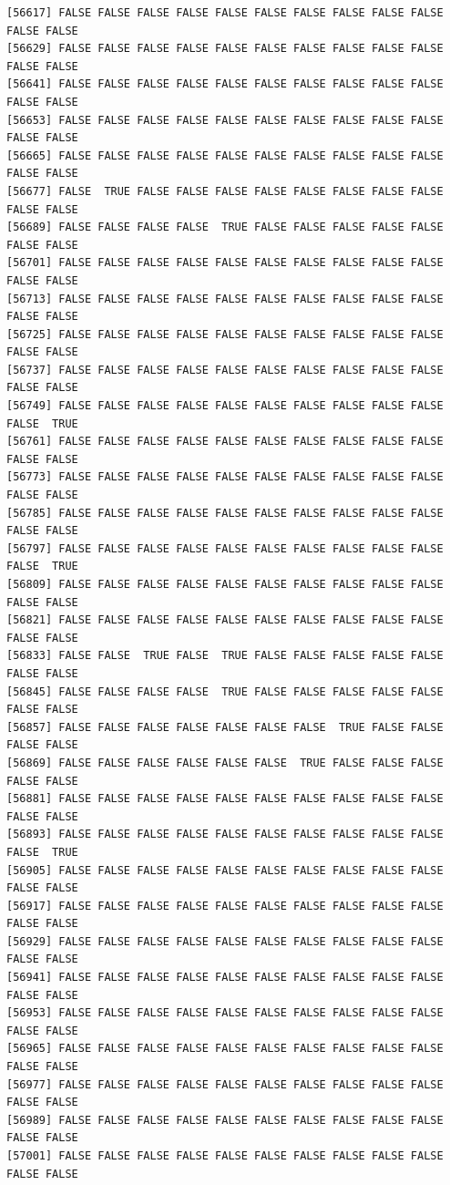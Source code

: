 \documentclass[
  a4paper,
  DIV=11,
  numbers=noendperiod]{scrartcl}
\begin{document}
\begin{verbatim}
[56617] FALSE FALSE FALSE FALSE FALSE FALSE FALSE FALSE FALSE FALSE FALSE FALSE
[56629] FALSE FALSE FALSE FALSE FALSE FALSE FALSE FALSE FALSE FALSE FALSE FALSE
[56641] FALSE FALSE FALSE FALSE FALSE FALSE FALSE FALSE FALSE FALSE FALSE FALSE
[56653] FALSE FALSE FALSE FALSE FALSE FALSE FALSE FALSE FALSE FALSE FALSE FALSE
[56665] FALSE FALSE FALSE FALSE FALSE FALSE FALSE FALSE FALSE FALSE FALSE FALSE
[56677] FALSE  TRUE FALSE FALSE FALSE FALSE FALSE FALSE FALSE FALSE FALSE FALSE
[56689] FALSE FALSE FALSE FALSE  TRUE FALSE FALSE FALSE FALSE FALSE FALSE FALSE
[56701] FALSE FALSE FALSE FALSE FALSE FALSE FALSE FALSE FALSE FALSE FALSE FALSE
[56713] FALSE FALSE FALSE FALSE FALSE FALSE FALSE FALSE FALSE FALSE FALSE FALSE
[56725] FALSE FALSE FALSE FALSE FALSE FALSE FALSE FALSE FALSE FALSE FALSE FALSE
[56737] FALSE FALSE FALSE FALSE FALSE FALSE FALSE FALSE FALSE FALSE FALSE FALSE
[56749] FALSE FALSE FALSE FALSE FALSE FALSE FALSE FALSE FALSE FALSE FALSE  TRUE
[56761] FALSE FALSE FALSE FALSE FALSE FALSE FALSE FALSE FALSE FALSE FALSE FALSE
[56773] FALSE FALSE FALSE FALSE FALSE FALSE FALSE FALSE FALSE FALSE FALSE FALSE
[56785] FALSE FALSE FALSE FALSE FALSE FALSE FALSE FALSE FALSE FALSE FALSE FALSE
[56797] FALSE FALSE FALSE FALSE FALSE FALSE FALSE FALSE FALSE FALSE FALSE  TRUE
[56809] FALSE FALSE FALSE FALSE FALSE FALSE FALSE FALSE FALSE FALSE FALSE FALSE
[56821] FALSE FALSE FALSE FALSE FALSE FALSE FALSE FALSE FALSE FALSE FALSE FALSE
[56833] FALSE FALSE  TRUE FALSE  TRUE FALSE FALSE FALSE FALSE FALSE FALSE FALSE
[56845] FALSE FALSE FALSE FALSE  TRUE FALSE FALSE FALSE FALSE FALSE FALSE FALSE
[56857] FALSE FALSE FALSE FALSE FALSE FALSE FALSE  TRUE FALSE FALSE FALSE FALSE
[56869] FALSE FALSE FALSE FALSE FALSE FALSE  TRUE FALSE FALSE FALSE FALSE FALSE
[56881] FALSE FALSE FALSE FALSE FALSE FALSE FALSE FALSE FALSE FALSE FALSE FALSE
[56893] FALSE FALSE FALSE FALSE FALSE FALSE FALSE FALSE FALSE FALSE FALSE  TRUE
[56905] FALSE FALSE FALSE FALSE FALSE FALSE FALSE FALSE FALSE FALSE FALSE FALSE
[56917] FALSE FALSE FALSE FALSE FALSE FALSE FALSE FALSE FALSE FALSE FALSE FALSE
[56929] FALSE FALSE FALSE FALSE FALSE FALSE FALSE FALSE FALSE FALSE FALSE FALSE
[56941] FALSE FALSE FALSE FALSE FALSE FALSE FALSE FALSE FALSE FALSE FALSE FALSE
[56953] FALSE FALSE FALSE FALSE FALSE FALSE FALSE FALSE FALSE FALSE FALSE FALSE
[56965] FALSE FALSE FALSE FALSE FALSE FALSE FALSE FALSE FALSE FALSE FALSE FALSE
[56977] FALSE FALSE FALSE FALSE FALSE FALSE FALSE FALSE FALSE FALSE FALSE FALSE
[56989] FALSE FALSE FALSE FALSE FALSE FALSE FALSE FALSE FALSE FALSE FALSE FALSE
[57001] FALSE FALSE FALSE FALSE FALSE FALSE FALSE FALSE FALSE FALSE FALSE FALSE

\end{verbatim}
\end{document}
